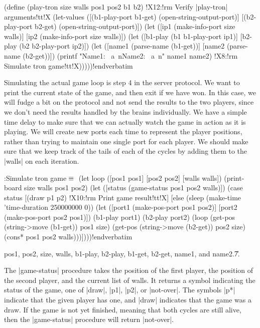 \Y\B \verbatim
(define (play-tron size walls pos1 pos2 b1 b2)
  !X12:!rm Verify |play-tron| arguments!tt!X
  (let-values ([(b1-play-port b1-get) (open-string-output-port)]
               [(b2-play-port b2-get) (open-string-output-port)])
    (let ([ip1 (make-info-port size walls)]
          [ip2 (make-info-port size walls)])
      (let ([b1-play (b1 b1-play-port ip1)]
            [b2-play (b2 b2-play-port ip2)])
        (let ([name1 (parse-name (b1-get))] [name2 (parse-name (b2-get))])
          (printf "Name1: ~a~nName2: ~a~n" name1 name2)
          !X8:!rm Simulate tron game!tt!X)))))!endverbatim  \par
\fi

Simulating the actual game loop is step 4 in the server protocol.
We want 
to print the current state of the game, and then exit if we have won. In 
this case, we will fudge a bit on the protocol and not send the results to 
the two players, since we don't need the results handled by the brains 
individually. We have a simple time delay to make sure that we can actually 
watch the game in action as it is playing. We will create new ports each 
time to represent the player positions, rather than trying to maintain 
one single port for each player. We should make sure that we keep track of 
the tails of each of the cycles by adding them to the |walls| on each 
iteration.


\Y\B\4:Simulate tron game\X${}\equiv{}$\6
\verbatim
(let loop ([pos1 pos1] [pos2 pos2] [walls walls])
  (print-board size walls pos1 pos2)
  (let ([status (game-status pos1 pos2 walls)])
    (case status
      [(draw p1 p2) !X10:!rm Print game result!tt!X]
      [else
        (sleep (make-time 'time-duration 250000000 0))
        (let ([port1 (make-pos-port pos1 pos2)] 
              [port2 (make-pos-port pos2 pos1)])
          (b1-play port1) (b2-play port2)
          (loop (get-pos (string->move (b1-get)) pos1 size)
                (get-pos (string->move (b2-get)) pos2 size)
                (cons* pos1 pos2 walls)))])))!endverbatim \par
\CAP pos1, pos2, size, walls, b1-play, b2-play, b1-get, b2-get, name1, and name2.\U7.\fi

The |game-status| procedure takes the position of the first player, 
the position of the second player, and the current list of walls. 
It returns a symbol indicating the status of the game, one of 
|draw|, |p1|, |p2|, or |not-over|. The symbols |p*| indicate that 
the given player has one, and |draw| indicates that the game was a draw. 
If the game is not yet finished, meaning that both cycles are still 
alive, then the |game-status| procedure will return |not-over|.

